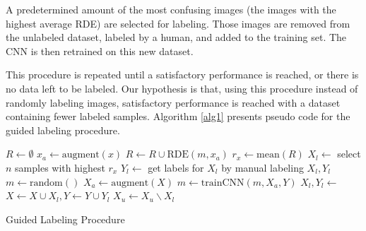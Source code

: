 \documentclass[10pt,twocolumn,letterpaper]{article}
\begin{document}
A predetermined amount of the most confusing images (the images with
the highest average RDE) are selected for labeling. Those images are
removed from the unlabeled dataset, labeled by a human, and added to
the training set. The CNN is then retrained on this new dataset.

This procedure is repeated until a satisfactory performance is
reached, or there is no data left to be labeled. Our hypothesis is
that, using this procedure instead of randomly labeling images,
satisfactory performance is reached with a dataset containing fewer
labeled samples. Algorithm \ref{alg1} presents pseudo code for the
guided labeling procedure.

\begin{algorithm*}
  \begin{algorithmic}
     
      \State $R \leftarrow \emptyset$ 
       
        \State $x_a \leftarrow \text{augment}(x)$
        \State $R \leftarrow R \cup \text{RDE}(m,x_a)$ 
      \EndFor
      \State $r_x \leftarrow \text{mean}(R)$  
    \EndFor
    \State $X_l \leftarrow $ select $n$ samples with highest $r_x$
    \State $Y_l \leftarrow $ get labels for $X_l$ by manual labeling
    \State \Return $X_l, Y_l$
    \EndProcedure
    \Statex
      \State $m \leftarrow \text{random}()$ 
        \State $X_a \leftarrow \text{augment}(X)$ 
        \State $m \leftarrow \text{trainCNN}(m,X_a,Y)$ 
        \EndWhile{}
        \State $X_l,Y_l \leftarrow $ 
        \State $X \leftarrow X \cup X_l, Y \leftarrow Y \cup Y_l$ 
        \State $X_u \leftarrow X_u \backslash X_l$ 
      \EndWhile{}
    \State {} 
    \EndProcedure
  \end{algorithmic}
  \caption{Guided Labeling Procedure\label{alg1}}
\end{algorithm*}
\end{document}
